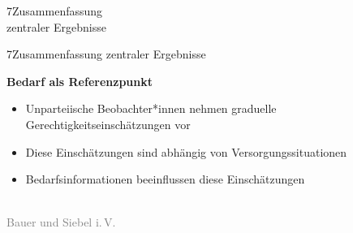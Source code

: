 \documentclass[xcolor=table,9pt,aspectratio=169]{beamer}
\begin{document}
\begin{frame}
\begin{overlayarea}{\textwidth}{0.81\paperheight}{
   \vspace*{11mm}
   \textcolor{uolblue}
   {7\hspace*{1em}Zusammenfassung\\\hspace*{1.5em}zentraler Ergebnisse}
}
\end{overlayarea}
\end{frame}


\begin{frame}{\vspace*{10mm}7\hspace*{1em}Zusammenfassung zentraler Ergebnisse}
\begin{multicols}{2}
   \textbf{Bedarf als Referenzpunkt}
   \medskip
   \begin{itemize}
   \item[(1)] Unparteiische Beobachter*innen nehmen graduelle Gerechtigkeitseinschätzungen vor
   \item[(2)] Diese Einschätzungen sind abhängig von Versorgungssituationen
   \item[(3)] Bedarfsinformationen beeinflussen diese Einschätzungen
\end{itemize}
   \vfill
   \begin{center}
      \\
      \textcolor{gray}{Bauer und Siebel i.\,V.}
   \end{center}
\end{multicols}
\end{frame}
\end{document}
